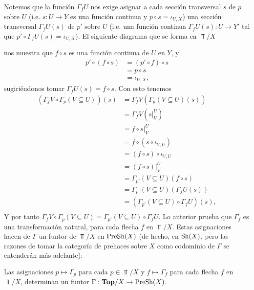 
Notemos que la función $\Gamma_f U$ nos exige asignar a cada sección transversal $s$ de $p$ sobre $U$ (i.e. $s:U\to Y$ es una función continua y $p\circ s=\iota_{U,X}$) una sección transversal $\Gamma_f U (s)$ de $p'$ sobre $U$ (i.e. una función continua $\Gamma_f U (s):U\to Y'$ tal que $p'\circ \Gamma_f U(s)=\iota_{U,X}$). El siguiente diagrama que se forma en $\Top /X$

nos muestra que $f\circ s$ es una función continua de $U$ en $Y$, y
$$
\begin{aligned}
   p'\circ (f\circ s)&=(p'\circ f)\circ s\\
                     &=p\circ s\\
                     &=\iota_{U,X},
\end{aligned}
$$
sugiriéndonos tomar $\Gamma_f U (s)=f\circ s$. Con esto tenemos
$$
\begin{aligned}
   (\Gamma_f V\circ\Gamma_p(V\subseteq U))(s) &=\Gamma_f V(\Gamma_p (V\subseteq U)(s))\\
                                              &= \Gamma_f V(s|^{U}_{V})\\
                                              &=f\circ s|^{U}_{V}\\
                                              &=f\circ (s\circ \iota_{V,U})\\
                                              &=(f\circ s)\circ \iota_{V,U}\\
                                              &=(f\circ s)|^{U}_{V}\\
                                              &=\Gamma_{p'}(V\subseteq U)(f\circ s)\\
                                              &=\Gamma_{p'}(V\subseteq U)(\Gamma_f U(s))\\
                                              &=(\Gamma_{p'}(V\subseteq U)\circ\Gamma_f U)(s),\\
\end{aligned}
$$
Y por tanto $\Gamma_f V\circ \Gamma_p(V\subseteq U)=\Gamma_{p'}(V\subseteq U)\circ \Gamma_f U$. Lo anterior prueba que $\Gamma_f$ es una transformación natural, para cada flecha $f$ en $\Top /X$. Estas asignaciones hacen de $\Gamma$ un funtor de $\Top /X$ en $\normalfont{\text{PreSh}}(X)$ (de hecho, en $\normalfont{\text{Sh}}(X)$, pero las razones de tomar la categoría de prehaces sobre $X$ como codominio de $\Gamma$ se entenderán más adelante):
\begin{Prop}
   Las asignaciones $p\mapsto \Gamma_p$ para cada $p\in \Top /X$ y $f\mapsto \Gamma_f$ para cada flecha $f$ en $\Top /X$, determinan un funtor $\Gamma:\normalfont{\textbf{Top}} /X\to\normalfont{\text{PreSh}}(X)$.   
\end{Prop}
